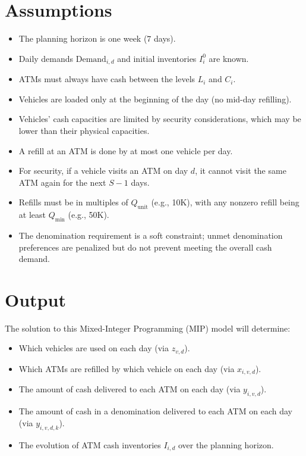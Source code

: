 \documentclass[11pt]{article}
\begin{document}
\section*{Assumptions}
\begin{itemize}[leftmargin=1.5cm]
    \item The planning horizon is one week (\(7\) days).
    \item Daily demands \(\text{Demand}_{i,d}\) and initial inventories \(I_i^0\) are known.
    \item ATMs must always have cash between the levels \(L_i\) and \(C_i\).
    \item Vehicles are loaded only at the beginning of the day (no mid-day refilling).
    \item Vehicles' cash capacities are limited by security considerations, which may be lower than their physical capacities.
    \item A refill at an ATM is done by at most one vehicle per day.
    \item For security, if a vehicle visits an ATM on day \(d\), it cannot visit the same ATM again for the next \(S-1\) days.
    \item Refills must be in multiples of \(Q_{\text{unit}}\) (e.g., 10K), with any nonzero refill being at least \(Q_{\min}\) (e.g., 50K).
    \item The denomination requirement is a soft constraint; unmet denomination preferences are penalized but do not prevent meeting the overall cash demand.
\end{itemize}

\section*{Output}
The solution to this Mixed-Integer Programming (MIP) model will determine:
\begin{itemize}[leftmargin=1.5cm]
    \item Which vehicles are used on each day (via \(z_{v,d}\)).
    \item Which ATMs are refilled by which vehicle on each day (via \(x_{i,v,d}\)).
    \item The amount of cash delivered to each ATM on each day (via \(y_{i,v,d}\)).
    \item The amount of cash in a denomination delivered to each ATM on each day (via \(y_{i,v,d,k}\)).
    \item The evolution of ATM cash inventories \(I_{i,d}\) over the planning horizon.
\end{itemize}
\end{document}
